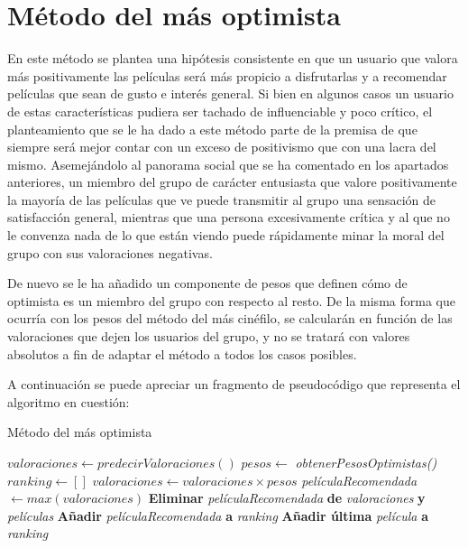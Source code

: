 \section{Método del más optimista}

En este método se plantea una hipótesis consistente en que un usuario que valora más positivamente las películas será más propicio a disfrutarlas y a recomendar películas que sean de gusto e interés general. Si bien en algunos casos un usuario de estas características pudiera ser tachado de influenciable y poco crítico, el planteamiento que se le ha dado a este método parte de la premisa de que siempre será mejor contar con un exceso de positivismo que con una lacra del mismo. Asemejándolo al panorama social que se ha comentado en los apartados anteriores, un miembro del grupo de carácter entusiasta que valore positivamente la mayoría de las películas que ve puede transmitir al grupo una sensación de satisfacción general, mientras que una persona excesivamente crítica y al que no le convenza nada de lo que están viendo puede rápidamente minar la moral del grupo con sus valoraciones negativas.

De nuevo se le ha añadido un componente de pesos que definen cómo de optimista es un miembro del grupo con respecto al resto. De la misma forma que ocurría con los pesos del método del más cinéfilo, se calcularán en función de las valoraciones que dejen los usuarios del grupo, y no se tratará con valores absolutos a fin de adaptar el método a todos los casos posibles.

A continuación se puede apreciar un fragmento de pseudocódigo que representa el algoritmo en cuestión:
\newpage

\begin{algorithm}
	\caption{Método del más optimista}
	\begin{algorithmic}[1]
		\State $valoraciones \gets predecirValoraciones()$
		\State $pesos \gets $ \textit{obtenerPesosOptimistas()}
		\State $ranking \gets []$
		\State $valoraciones \gets valoraciones \times pesos$
		\State \textit{películaRecomendada} $ \gets max(valoraciones)$
		\State \textbf{Eliminar} \textit{películaRecomendada} \textbf{de} \textit{valoraciones} \textbf{y} \textit{películas}
		\State \textbf{Añadir} \textit{películaRecomendada} \textbf{a} \textit{ranking}
		\EndWhile
		\State \textbf{Añadir última} \textit{película} \textbf{a} \textit{ranking}
	\end{algorithmic}
\end{algorithm}

